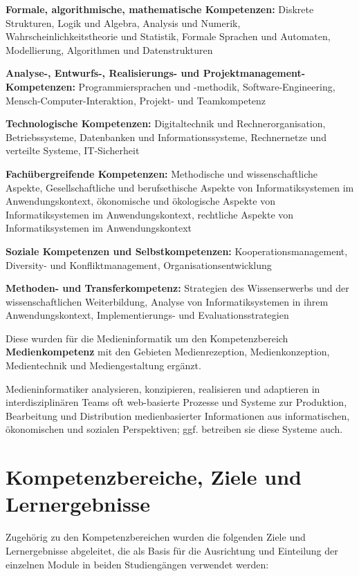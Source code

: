 \textbf{Formale, algorithmische, mathematische Kompetenzen:} Diskrete
Strukturen, Logik und Algebra, Analysis und Numerik,
Wahrscheinlichkeitstheorie und Statistik, Formale Sprachen und
Automaten, Modellierung, Algorithmen und Datenstrukturen

\textbf{Analyse-, Entwurfs-, Realisierungs- und
Projektmanagement-Kompetenzen:} Programmiersprachen und -methodik,
Software-Engineering, Mensch-Computer-Interaktion, Projekt- und
Teamkompetenz

\textbf{Technologische Kompetenzen:} Digitaltechnik und
Rechnerorganisation, Betriebssysteme, Datenbanken und
Informationssysteme, Rechnernetze und verteilte Systeme, IT-Sicherheit

\textbf{Fachübergreifende Kompetenzen:} Methodische und
wissenschaftliche Aspekte, Gesellschaftliche und berufsethische Aspekte
von Informatiksystemen im Anwendungskontext, ökonomische und ökologische
Aspekte von Informatiksystemen im Anwendungskontext, rechtliche Aspekte
von Informatiksystemen im Anwendungskontext

\textbf{Soziale Kompetenzen und Selbstkompetenzen:}
Kooperationsmanagement, Diversity- und Konfliktmanagement,
Organisationsentwicklung

\textbf{Methoden- und Transferkompetenz:} Strategien des Wissenserwerbs
und der wissenschaftlichen Weiterbildung, Analyse von Informatiksystemen
in ihrem Anwendungskontext, Implementierungs- und Evaluationsstrategien

Diese wurden für die Medieninformatik um den Kompetenzbereich
\textbf{Medienkompetenz} mit den Gebieten Medienrezeption,
Medienkonzeption, Medientechnik und Mediengestaltung ergänzt.

Medieninformatiker analysieren, konzipieren, realisieren und adaptieren
in interdisziplinären Teams oft web-basierte Prozesse und Systeme zur
Produktion, Bearbeitung und Distribution medienbasierter Informationen
aus informatischen, ökonomischen und sozialen Perspektiven; ggf.
betreiben sie diese Systeme auch.

\section{Kompetenzbereiche, Ziele und
Lernergebnisse}\label{kompetenzbereiche-ziele-und-lernergebnisse}

Zugehörig zu den Kompetenzbereichen wurden die folgenden Ziele und
Lernergebnisse abgeleitet, die als Basis für die Ausrichtung und
Einteilung der einzelnen Module in beiden Studiengängen verwendet
werden:

